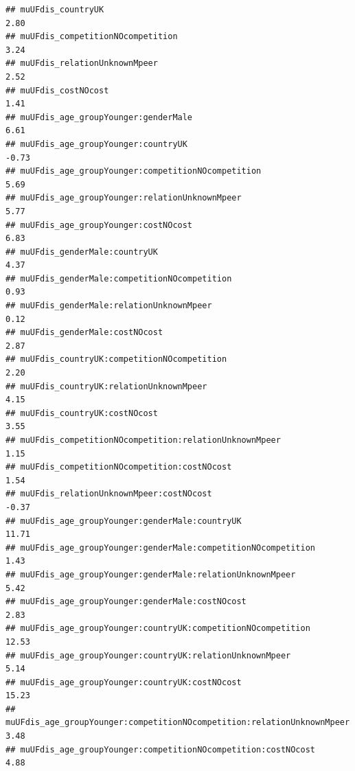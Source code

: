 \documentclass[
]{article}
\begin{document}
\begin{verbatim}
## muUFdis_countryUK                                                                     2.80
## muUFdis_competitionNOcompetition                                                      3.24
## muUFdis_relationUnknownMpeer                                                          2.52
## muUFdis_costNOcost                                                                    1.41
## muUFdis_age_groupYounger:genderMale                                                   6.61
## muUFdis_age_groupYounger:countryUK                                                   -0.73
## muUFdis_age_groupYounger:competitionNOcompetition                                     5.69
## muUFdis_age_groupYounger:relationUnknownMpeer                                         5.77
## muUFdis_age_groupYounger:costNOcost                                                   6.83
## muUFdis_genderMale:countryUK                                                          4.37
## muUFdis_genderMale:competitionNOcompetition                                           0.93
## muUFdis_genderMale:relationUnknownMpeer                                               0.12
## muUFdis_genderMale:costNOcost                                                         2.87
## muUFdis_countryUK:competitionNOcompetition                                            2.20
## muUFdis_countryUK:relationUnknownMpeer                                                4.15
## muUFdis_countryUK:costNOcost                                                          3.55
## muUFdis_competitionNOcompetition:relationUnknownMpeer                                 1.15
## muUFdis_competitionNOcompetition:costNOcost                                           1.54
## muUFdis_relationUnknownMpeer:costNOcost                                              -0.37
## muUFdis_age_groupYounger:genderMale:countryUK                                        11.71
## muUFdis_age_groupYounger:genderMale:competitionNOcompetition                          1.43
## muUFdis_age_groupYounger:genderMale:relationUnknownMpeer                              5.42
## muUFdis_age_groupYounger:genderMale:costNOcost                                        2.83
## muUFdis_age_groupYounger:countryUK:competitionNOcompetition                          12.53
## muUFdis_age_groupYounger:countryUK:relationUnknownMpeer                               5.14
## muUFdis_age_groupYounger:countryUK:costNOcost                                        15.23
## muUFdis_age_groupYounger:competitionNOcompetition:relationUnknownMpeer                3.48
## muUFdis_age_groupYounger:competitionNOcompetition:costNOcost                          4.88

\end{verbatim}
\end{document}

